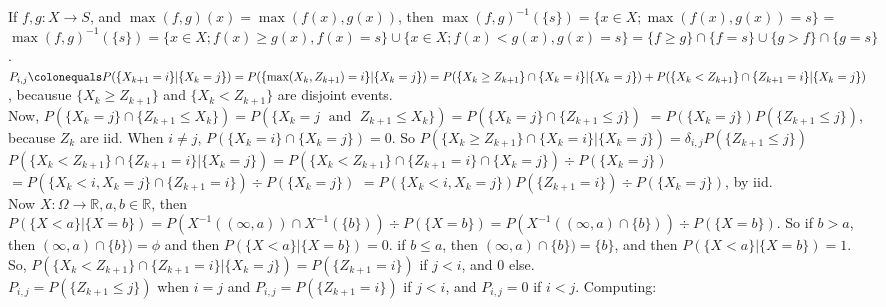\documentclass[12pt]{article}
\newcommand{\reals}[0] { \mathbb{R}}
\newcommand{\Om}[0] { \Omega }
\newcommand{\AND}[0]{ \; \textrm{ and } \;  }
\newcommand{\rarw}[0] { \rightarrow }
\newcommand{ \defeq }[0] { \colonequals }
\begin{document}
If $f,g : X \rarw S$, and $\max(f,g)(x) = \max(f(x),g(x))$, then $\max(f,g)^{-1}(\{s\}) = \{ x \in X; \max(f(x),g(x)) = s\}$ = 
$\max(f,g)^{-1}(\{s\}) = \{ x \in X; f(x) \ge g(x), f(x) = s \} \cup  \{ x \in X; f(x) < g(x), g(x) = s \} = \{ f \ge g \} \cap \{ f = s \} \cup \{ g > f \} \cap \{ g = s \} $.  \\

$P_{i,j} \defeq P( \{ X_{k+1} = i \} | \{ X_{k} = j \} ) = P( \{ \max(X_k, Z_{k+1})= i \} | \{ X_{k} = j \} ) = P( \{  X_k \ge Z_{k+1} \} \cap \{ X_k= i \} | \{ X_{k} = j \} ) + P( \{  X_k < Z_{k+1} \} \cap \{ Z_{k+1}= i \} | \{ X_{k} = j \} )$, becausue $\{  X_k \ge Z_{k+1} \}$ and $\{  X_k < Z_{k+1} \}$ are disjoint events. \\

Now, $P( \{ X_k = j \} \cap \{  Z_{k+1} \le X_k \} ) = P(\{ X_k=j \AND Z_{k+1} \le X_k \}) = P(\{ X_k=j \} \cap \{ Z_{k+1} \le j \})$ $= P(\{ X_k=j \} ) P( \{ Z_{k+1} \le j \})$, because $Z_k$ are iid. When $i \not = j$, $P( \{ X_k= i \} \cap \{ X_{k} = j \} ) = 0$. So $P( \{  X_k \ge Z_{k+1} \} \cap \{ X_k= i \} | \{ X_{k} = j \} ) = \delta_{i,j} P( \{  Z_{k+1} \le j \}  ) $ \\ 


$P( \{  X_k < Z_{k+1} \} \cap \{ Z_{k+1}= i \} | \{ X_{k} = j \} ) = P( \{  X_k < Z_{k+1} \} \cap \{ Z_{k+1}= i \} \cap \{ X_{k} = j \} ) \div P(\{ X_{k} = j \}) $
$= P( \{  X_k < i,X_{k} = j \}  \cap \{ Z_{k+1}= i \} ) \div P(\{ X_{k} = j \}) $
$= P( \{  X_k < i,X_{k} = j \} ) P( \{ Z_{k+1}= i \} ) \div P(\{ X_{k} = j \}) $, by iid.  \\

Now $X: \Om \rarw \reals, a,b \in \reals$, then $P( \{ X < a \} | \{ X = b \}) = P( X^{-1} ((\infty,a)) \cap X^{-1}(\{b\})) \div P(\{X=b\}) = P( X^{-1} ((\infty,a) \cap \{b\})) \div P(\{X=b\})$. So if $b > a$, then $(\infty,a) \cap \{b\}) = \phi$ and then $P( \{ X < a \} | \{ X = b \}) = 0$. if $b \le a$, then $(\infty,a) \cap \{b\}) = \{ b \}$, and then $P( \{ X < a \} | \{ X = b \}) = 1$. \\

\noindent
So, $P( \{  X_k < Z_{k+1} \} \cap \{ Z_{k+1}= i \} | \{ X_{k} = j \} ) = P( \{ Z_{k+1}= i \} ) $ if $j < i$, and 0 else. \\

\noindent
$P_{i,j} = P( \{  Z_{k+1} \le j \}  ) $ when $i = j$ and $P_{i,j} = P( \{ Z_{k+1}= i \} ) $ if $j < i$, and $P_{i,j} = 0$ if $i < j$. Computing:
\end{document}
